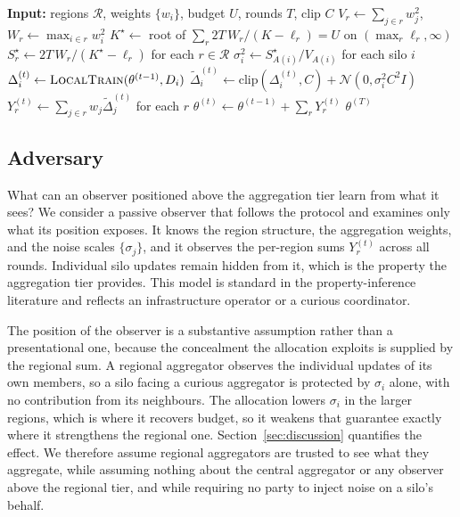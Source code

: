 \documentclass[acmsmall,screen,review,anonymous]{acmart}
\theoremstyle{acmdefinition}%
\newcommand{\Fulcrum}{\textsc{Fulcrum}\xspace}
\newcommand{\Reg}{\mathcal{R}}
\begin{document}
\begin{algorithm}[t]
\caption{\Fulcrum: federated training with min-max optimal regional allocation}
\label{alg:main}
\begin{algorithmic}[1]
\STATE \textbf{Input:} regions $\Reg$, weights $\{w_i\}$, budget $U$, rounds $T$, clip $C$
\STATE $V_r \leftarrow \sum_{j \in r} w_j^2$, \quad $W_r \leftarrow \max_{i \in r} w_i^2$
\STATE $K^\star \leftarrow$ root of $\sum_r 2T\,W_r/(K-\ell_r) = U$ on $(\max_r \ell_r, \infty)$
\STATE $S_r^\star \leftarrow 2T\,W_r/(K^\star - \ell_r)$ \quad for each $r \in \Reg$
\STATE $\sigma_i^2 \leftarrow S_{A(i)}^\star / V_{A(i)}$ \quad for each silo $i$
    \STATE $\Delta_i^{(t)} \leftarrow \textsc{LocalTrain}(\theta^{(t-1)}, D_i)$
    \STATE $\tilde{\Delta}_i^{(t)} \leftarrow \mathrm{clip}(\Delta_i^{(t)}, C) + \mathcal{N}(0, \sigma_i^2 C^2 I)$
  \ENDFOR
  \STATE $Y_r^{(t)} \leftarrow \sum_{j \in r} w_j \tilde{\Delta}_j^{(t)}$ \quad for each $r$
  \STATE $\theta^{(t)} \leftarrow \theta^{(t-1)} + \sum_{r} Y_r^{(t)}$
\ENDFOR
\RETURN $\theta^{(T)}$
\end{algorithmic}
\end{algorithm}

\subsection{Adversary}
\label{sec:adversary}

What can an observer positioned above the aggregation tier learn from what it sees? We consider a passive observer that follows the protocol and examines only what its
position exposes. It knows the region structure, the aggregation weights, and the noise
scales $\{\sigma_j\}$, and it observes the per-region sums $Y_r^{(t)}$ across all
rounds. Individual silo updates remain hidden from it, which is the property the
aggregation tier provides. This model is standard in the property-inference
literature \cite{melis2019exploiting} and reflects an infrastructure operator or a
curious coordinator.

The position of the observer is a substantive assumption rather than a
presentational one, because the concealment the allocation exploits is supplied by
the regional sum. A regional aggregator observes the individual updates of its own
members, so a silo facing a curious aggregator is protected by $\sigma_i$ alone,
with no contribution from its neighbours. The allocation lowers $\sigma_i$ in the
larger regions, which is where it recovers budget, so it weakens that guarantee
exactly where it strengthens the regional one. Section~\ref{sec:discussion}
quantifies the effect. We therefore assume regional aggregators are trusted to see
what they aggregate, while assuming nothing about the central aggregator or any
observer above the regional tier, and while requiring no party to inject noise on a
silo's behalf.
\end{document}
